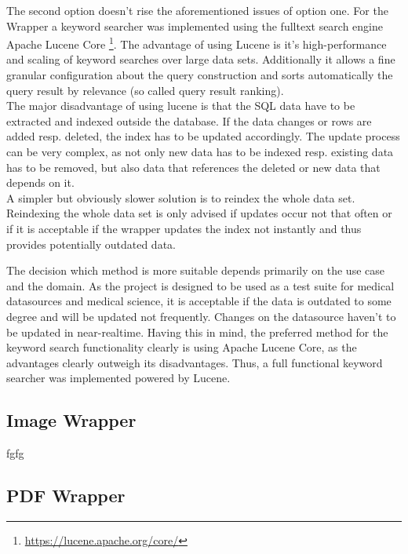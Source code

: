The second option doesn't rise the aforementioned issues of option one. For the Wrapper a keyword searcher was implemented using the fulltext search engine Apache Lucene Core \footnote{\url{https://lucene.apache.org/core/}}. The advantage of using Lucene is it's high-performance and scaling of keyword searches over large data sets. Additionally it allows a fine granular configuration about the query construction and sorts automatically the query result by relevance (so called query result ranking). \\
The major disadvantage of using lucene is that the SQL data have to be extracted and indexed outside the database. If the data changes or rows are added resp. deleted, the index has to be updated accordingly. The update process can be very complex, as not only new data has to be indexed resp. existing data has to be removed, but also data that references the deleted or new data that depends on it.\\
A simpler but obviously slower solution is to reindex the whole data set. Reindexing the whole data set is only advised if updates occur not that often or if it is acceptable if the wrapper updates the index not instantly and thus provides potentially outdated data.

The decision which method is more suitable depends primarily on the use case and the domain. As the project is designed to be used as a test suite for medical datasources and medical science, it is acceptable if the data is outdated to some degree and will be updated not frequently. Changes on the datasource haven't to be updated in near-realtime. Having this in mind, the preferred method for the keyword search functionality clearly is using Apache Lucene Core, as the  advantages clearly outweigh its disadvantages. Thus, a full functional keyword searcher was implemented powered by Lucene.

\subsection{Image Wrapper}
fgfg
\subsection{PDF Wrapper}